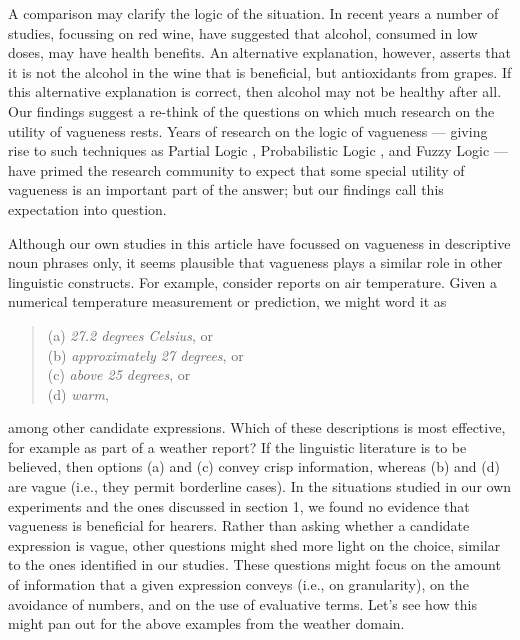 \documentclass[ %
  graybox       %
 ,envcountchap  %
 ,sectrefs      %
]{svmono}
\begin{document}
A comparison may clarify the logic of the situation. In recent years a number of studies, focussing on red wine, have suggested that alcohol, consumed in low doses, may have health benefits. An alternative explanation, however, asserts that it is not the alcohol in the wine that is beneficial, but antioxidants from grapes. If this alternative explanation is correct, then alcohol may not be healthy after all.\\[2ex]
%
Our findings suggest a re-think of the questions on which much research on the utility of vagueness rests. Years of research on the logic of vagueness --- giving rise to such techniques as Partial Logic \citep[e.g.,][]{Fine}, Probabilistic Logic \citep{Edgington}, and Fuzzy Logic \citep{Zadeh} --- have primed the research community to expect that some special utility of vagueness is an important part of the answer; but our findings call this expectation into question.

Although our own studies in this article have focussed on vagueness in descriptive noun phrases only, it seems plausible that vagueness plays a similar role in other linguistic constructs.
For example, consider reports on air temperature. Given a numerical temperature measurement or prediction, we might word it as
%
\begin{quote}
(a) {\em 27.2 degrees Celsius}, or\\
(b) {\em approximately 27 degrees}, or\\
(c) {\em above 25 degrees}, or\\
(d) {\em warm},
\end{quote}
%
among other candidate expressions. Which of these descriptions is most effective, for example as part of a weather report? If the linguistic literature is to be believed, then options (a) and (c) convey crisp information, whereas (b) and (d) are vague (i.e., they permit borderline cases). In the situations studied in our own experiments and the ones discussed in section 1, we found no evidence that vagueness is beneficial for hearers. Rather than asking whether a candidate expression is vague, other questions might shed more light on the choice, similar to the ones identified in our studies. These questions might focus on the amount of information that a given expression conveys (i.e., on granularity), on the avoidance of numbers, and on the use of evaluative terms. Let's see how this might pan out for the above examples from the weather domain.
\end{document}
